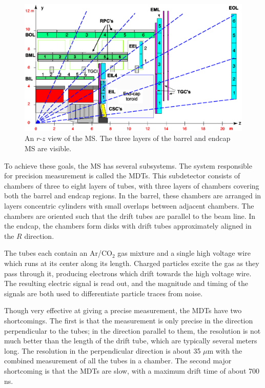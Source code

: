 \begin{centering}
\begin{figure}[bth]
\myfloatalign
\includegraphics[width=.90\linewidth]{figures/atlas/Muon_rz_large_sect_6.eps}
\caption{An $r$-$z$ view of the \ac{MS}. The three layers of the barrel and endcap \ac{MS} are visible.}
\label{fig:muon_rz}
\end{figure}
\end{centering}

To achieve these goals, the \ac{MS} has several subsystems. The system responsible for precision measurement is called the \acfp{MDT}. This subdetector consists of chambers of three to eight layers of tubes, with three layers of chambers covering both the barrel and endcap regions. In the barrel, these chambers are arranged in layers concentric cylinders with small overlaps between adjacent chambers. The chambers are oriented such that the drift tubes are parallel to the beam line. In the endcap, the chambers form disks with drift tubes approximately aligned in the $R$ direction. 

The tubes each contain an Ar/CO$_2$ gas mixture and a single high voltage wire which runs at its center along its length. Charged particles excite the gas as they pass through it, producing electrons which drift towards the high voltage wire. The resulting electric signal is read out, and the magnitude and timing of the signals are both used to differentiate particle traces from noise. 

Though very effective at giving a precise measurement, the \acp{MDT} have two shortcomings. The first is that the measurement is only precise in the direction perpendicular to the tubes; in the direction parallel to them, the resolution is not much better than the length of the drift tube, which are typically several meters long. The resolution in the perpendicular direction is about 35 $\mu$m with the combined measurement of all the tubes in a chamber. The second major shortcoming is that the \acp{MDT} are slow, with a maximum drift time of about 700 ns. 

